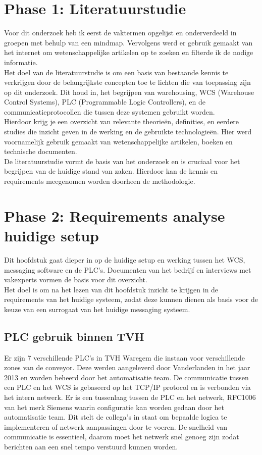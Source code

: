 \section{Phase 1: Literatuurstudie}
Voor dit onderzoek heb ik eerst de vaktermen opgelijst en onderverdeeld in groepen met behulp van een mindmap.
Vervolgens werd er gebruik gemaakt van het internet om wetenschappelijke artikelen op te zoeken en filterde ik de nodige informatie.
\\
Het doel van de literatuurstudie is om een basis van bestaande kennis te verkrijgen door de belangrijkste concepten toe te lichten die van toepassing zijn op dit onderzoek. 
Dit houd in, het begrijpen van warehousing, WCS (Warehouse Control Systems), PLC (Programmable Logic Controllers), en de communicatieprotocollen die tussen deze systemen gebruikt worden.
\\
Hierdoor krijg je een overzicht van relevante theorieën, definities, en eerdere studies die inzicht geven in de werking en de gebruikte technologieën.
Hier werd voornamelijk gebruik gemaakt van wetenschappelijke artikelen, boeken en technische documenten.
\\
De literatuurstudie vormt de basis van het onderzoek en is cruciaal voor het begrijpen van de huidige stand van zaken.
Hierdoor kan de kennis en requirements meegenomen worden doorheen de methodologie.


\section{Phase 2: Requirements analyse huidige setup}
Dit hoofdstuk gaat dieper in op de huidige setup en werking tussen het WCS, messaging software en de PLC's.
Documenten van het bedrijf en interviews met vakexperts vormen de basis voor dit overzicht.
\\
Het doel is om na het lezen van dit hoofdstuk inzicht te krijgen in de requirements van het huidige systeem, 
zodat deze kunnen dienen als basis voor de keuze van een surrogaat van het huidige messaging systeem.
 
\subsection{PLC gebruik binnen TVH}
Er zijn 7 verschillende PLC's in TVH Waregem die instaan voor verschillende zones van de conveyor.
Deze werden aangeleverd door Vanderlanden in het jaar 2013 en worden beheerd door het automatisatie team.
De communicatie tussen een PLC en het WCS is gebaseerd op het TCP/IP protocol en is verbonden via het intern netwerk.
Er is een tussenlaag tussen de PLC en het netwerk, RFC1006 van het merk Siemens waarin configuratie kan worden gedaan door het automatisatie team.
Dit stelt de collega's in staat om bepaalde logica te implementeren of netwerk aanpassingen door te voeren.
De snelheid van communicatie is essentieel, daarom moet het netwerk snel genoeg zijn zodat berichten aan een snel tempo verstuurd kunnen worden.

